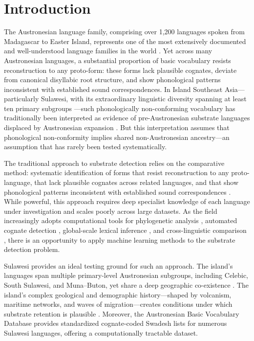 \documentclass[12pt]{article}
\begin{document}
\section{Introduction}

The Austronesian language family, comprising over 1,200 languages spoken from Madagascar to Easter Island, represents one of the most extensively documented and well-understood language families in the world \citep{blust2013}.
Yet across many Austronesian languages, a substantial proportion of basic vocabulary resists reconstruction to any proto-form: these forms lack plausible cognates, deviate from canonical disyllabic root structure, and show phonological patterns inconsistent with established sound correspondences.
In Island Southeast Asia---particularly Sulawesi, with its extraordinary linguistic diversity spanning at least ten primary subgroups \citep{blust2009}---such phonologically non-conforming vocabulary has traditionally been interpreted as evidence of pre-Austronesian substrate languages displaced by Austronesian expansion \citep{donohue2010, adelaar2005}.
But this interpretation assumes that phonological non-conformity implies shared non-Austronesian ancestry---an assumption that has rarely been tested systematically.

The traditional approach to substrate detection relies on the comparative method: systematic identification of forms that resist reconstruction to any proto-language, that lack plausible cognates across related languages, and that show phonological patterns inconsistent with established sound correspondences \citep{blust2009, thomason1988}.
While powerful, this approach requires deep specialist knowledge of each language under investigation and scales poorly across large datasets.
As the field increasingly adopts computational tools for phylogenetic analysis \citep{gray2009, list2018}, automated cognate detection \citep{list2012}, global-scale lexical inference \citep{jaeger2018}, and cross-linguistic comparison \citep{forkel2018}, there is an opportunity to apply machine learning methods to the substrate detection problem.

Sulawesi provides an ideal testing ground for such an approach.
The island's languages span multiple primary-level Austronesian subgroups, including Celebic, South Sulawesi, and Muna--Buton, yet share a deep geographic co-existence \citep{himmelmann2005}.
The island's complex geological and demographic history---shaped by volcanism, maritime networks, and waves of migration---creates conditions under which substrate retention is plausible \citep{bellwood1995}.
Moreover, the Austronesian Basic Vocabulary Database \citep[ABVD;][]{greenhill2008} provides standardized cognate-coded Swadesh lists for numerous Sulawesi languages, offering a computationally tractable dataset.
\end{document}
